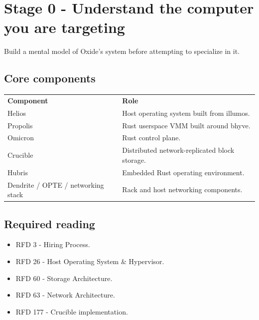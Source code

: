 \documentclass[11pt,letterpaper]{article}
\begin{document}
\section{Stage 0 - Understand the computer you are targeting}\label{sec:4}

\label{stage:0}

Build a mental model of Oxide's system before attempting to specialize in it.

\subsection*{Core components}

\begin{center}
\small
\begin{tabular}{>{\raggedright\arraybackslash}p{}>{\raggedright\arraybackslash}p{}}
\textbf{Component} & \textbf{Role} \\
Helios & Host operating system built from illumos. \\
Propolis & Rust userspace VMM built around bhyve. \\
Omicron & Rust control plane. \\
Crucible & Distributed network-replicated block storage. \\
Hubris & Embedded Rust operating environment. \\
Dendrite / OPTE / networking stack & Rack and host networking components. \\
\end{tabular}
\end{center}

\subsection*{Required reading}

\begin{itemize}

\item RFD 3 - Hiring Process.

\item RFD 26 - Host Operating System \& Hypervisor.

\item RFD 60 - Storage Architecture.

\item RFD 63 - Network Architecture.

\item RFD 177 - Crucible implementation.

\end{itemize}
\end{document}
